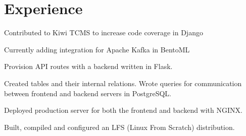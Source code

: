 \documentclass[]{resume-openfont}
\begin{document}
\begin{minipage}[t]{0.66\textwidth}


\section{Experience}

\vspace{\topsep} %
\begin{tightemize}
\item Contributed to Kiwi TCMS to increase code coverage in Django
\item Currently adding integration for Apache Kafka in BentoML
\end{tightemize}
\sectionsep

\vspace{\topsep} %
\begin{tightemize}
\item Provision API routes with a backend written in Flask.
\item Created tables and their internal relations. Wrote queries for communication between frontend and backend servers in PostgreSQL.
\item Deployed production server for both the frontend and backend with NGINX.
\end{tightemize}
\sectionsep


\begin{tightemize}
\item Built, compiled and configured an LFS (Linux From Scratch) distribution.
\end{tightemize}
\sectionsep



\end{minipage}
\end{document}
